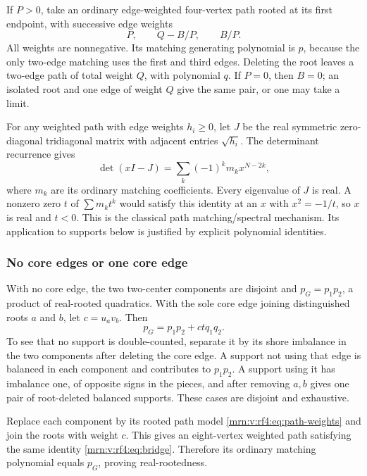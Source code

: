 \documentclass[11pt,a4paper]{article}
\theoremstyle{remark}\newtheorem{remark}[theorem]{Remark}
\begin{document}
If $P>0$, take an ordinary edge-weighted four-vertex path rooted at its first endpoint, with successive edge weights
\begin{equation}\label{mrn:v:rf4:eq:path-weights}
P,\qquad Q-B/P,\qquad B/P.
\end{equation}
All weights are nonnegative. Its matching generating polynomial is $p$, because the only two-edge matching uses the first and third edges. Deleting the root leaves a two-edge path of total weight $Q$, with polynomial $q$. If $P=0$, then $B=0$; an isolated root and one edge of weight $Q$ give the same pair, or one may take a limit.

For any weighted path with edge weights $h_i\ge0$, let $J$ be the real symmetric zero-diagonal tridiagonal matrix with adjacent entries $\sqrt{h_i}$. The determinant recurrence gives
\[
\det(xI-J)=\sum_k(-1)^k m_kx^{N-2k},
\]
where $m_k$ are its ordinary matching coefficients. Every eigenvalue of $J$ is real. A nonzero zero $t$ of $\sum m_kt^k$ would satisfy this identity at an $x$ with $x^2=-1/t$, so $x$ is real and $t<0$. This is the classical path matching/spectral mechanism. Its application to supports below is justified by explicit polynomial identities.

\subsubsection{No core edges or one core edge}
With no core edge, the two two-center components are disjoint and $p_G=p_1p_2$, a product of real-rooted quadratics. With the sole core edge joining distinguished roots $a$ and $b$, let $c=u_av_b$. Then
\begin{equation}\label{mrn:v:rf4:eq:bridge}
p_G=p_1p_2+ctq_1q_2.
\end{equation}
To see that no support is double-counted, separate it by its shore imbalance in the two components after deleting the core edge. A support not using that edge is balanced in each component and contributes to $p_1p_2$. A support using it has imbalance one, of opposite signs in the pieces, and after removing $a,b$ gives one pair of root-deleted balanced supports. These cases are disjoint and exhaustive.

Replace each component by its rooted path model \eqref{mrn:v:rf4:eq:path-weights} and join the roots with weight $c$. This gives an eight-vertex weighted path satisfying the same identity \eqref{mrn:v:rf4:eq:bridge}. Therefore its ordinary matching polynomial equals $p_G$, proving real-rootedness.
\end{document}
